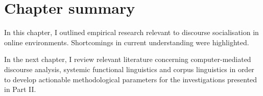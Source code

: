 
   \section{Chapter summary}

	  In this chapter, I outlined empirical research relevant to discourse socialisation in online environments. Shortcomings in current understanding were highlighted.

	  In the next chapter, I review relevant literature concerning computer-mediated discourse analysis, systemic functional linguistics and corpus linguistics in order to develop actionable methodological parameters for the investigations presented in Part II.

%






















